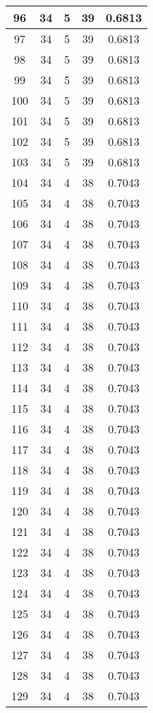 \documentclass[letterpaper, 12pt]{article}
\begin{document}
\begin{longtable}{|c|c|c|c|c|}
\hline
96 & 34 & 5 & 39 & 0.6813 \\
\hline
97 & 34 & 5 & 39 & 0.6813 \\
\hline
98 & 34 & 5 & 39 & 0.6813 \\
\hline
99 & 34 & 5 & 39 & 0.6813 \\
\hline
100 & 34 & 5 & 39 & 0.6813 \\
\hline
101 & 34 & 5 & 39 & 0.6813 \\
\hline
102 & 34 & 5 & 39 & 0.6813 \\
\hline
103 & 34 & 5 & 39 & 0.6813 \\
\hline
104 & 34 & 4 & 38 & 0.7043 \\
\hline
105 & 34 & 4 & 38 & 0.7043 \\
\hline
106 & 34 & 4 & 38 & 0.7043 \\
\hline
107 & 34 & 4 & 38 & 0.7043 \\
\hline
108 & 34 & 4 & 38 & 0.7043 \\
\hline
109 & 34 & 4 & 38 & 0.7043 \\
\hline
110 & 34 & 4 & 38 & 0.7043 \\
\hline
111 & 34 & 4 & 38 & 0.7043 \\
\hline
112 & 34 & 4 & 38 & 0.7043 \\
\hline
113 & 34 & 4 & 38 & 0.7043 \\
\hline
114 & 34 & 4 & 38 & 0.7043 \\
\hline
115 & 34 & 4 & 38 & 0.7043 \\
\hline
116 & 34 & 4 & 38 & 0.7043 \\
\hline
117 & 34 & 4 & 38 & 0.7043 \\
\hline
118 & 34 & 4 & 38 & 0.7043 \\
\hline
119 & 34 & 4 & 38 & 0.7043 \\
\hline
120 & 34 & 4 & 38 & 0.7043 \\
\hline
121 & 34 & 4 & 38 & 0.7043 \\
\hline
122 & 34 & 4 & 38 & 0.7043 \\
\hline
123 & 34 & 4 & 38 & 0.7043 \\
\hline
124 & 34 & 4 & 38 & 0.7043 \\
\hline
125 & 34 & 4 & 38 & 0.7043 \\
\hline
126 & 34 & 4 & 38 & 0.7043 \\
\hline
127 & 34 & 4 & 38 & 0.7043 \\
\hline
128 & 34 & 4 & 38 & 0.7043 \\
\hline
129 & 34 & 4 & 38 & 0.7043 \\

\end{longtable}
\end{document}
